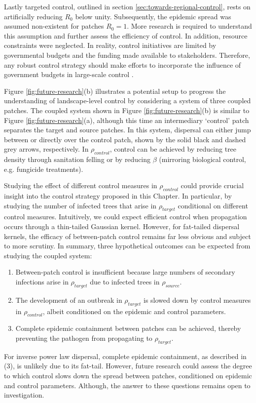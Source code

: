 Lastly targeted control, outlined in section \ref{sec:towards-regional-control}, rests on artificially reducing $R_0$ below unity.
Subsequently, the epidemic spread was assumed non-existent for patches $R_0=1$.
More research is required to understand this assumption and further assess the efficiency of control.
In addition, resource constraints were neglected. In reality, control initiatives are limited by governmental budgets and the funding made available to stakeholders.
Therefore, any robust control strategy should make efforts to incorporate the influence of government budgets in large-scale control \cite{large-scale-control}.

Figure \ref{fig:future-research}(b) illustrates a potential setup to progress the understanding of landscape-level control by considering a system of three coupled patches.
The coupled system shown in Figure \ref{fig:future-research}(b) is similar to Figure \ref{fig:future-research}(a), although this time an intermediary `control' patch separates the target and source patches. In this system, dispersal can either jump between or directly over the control patch, shown by the solid black and dashed grey arrows, respectively. In $\rho_{control}$, control can be achieved by reducing tree density through sanitation felling or by reducing $\beta$ (mirroring biological control, e.g. fungicide treatments).

Studying the effect of different control measures in $\rho_{control}$ could provide crucial insight into the control strategy proposed in this Chapter.
In particular, by studying the number of infected trees that arise in $\rho_{target}$ conditional on different control measures. 
Intuitively, we could expect efficient control when propagation occurs through a thin-tailed Gaussian kernel.
However, for fat-tailed dispersal kernels, the efficacy of between-patch control remains far less obvious and subject to more scrutiny.
In summary, three hypothetical outcomes can be expected from studying the coupled system: 
\begin{enumerate}
    \item Between-patch control is insufficient because large numbers of secondary infections arise in $\rho_{target}$ due to infected trees in $\rho_{source}$.
    \item The development of an outbreak in $\rho_{target}$ is slowed down by control measures in $\rho_{control}$, albeit conditioned on the epidemic and control parameters.
    \item Complete epidemic containment between patches can be achieved, thereby preventing the pathogen from propagating to $\rho_{target}$.
\end{enumerate}
For inverse power law dispersal, complete epidemic containment, as described in (3), is unlikely due to its fat-tail.
However, future research could assess the degree to which control slows down the spread between patches, conditioned on epidemic and control parameters. Although, the answer to these questions remains open to investigation.

\newpage













